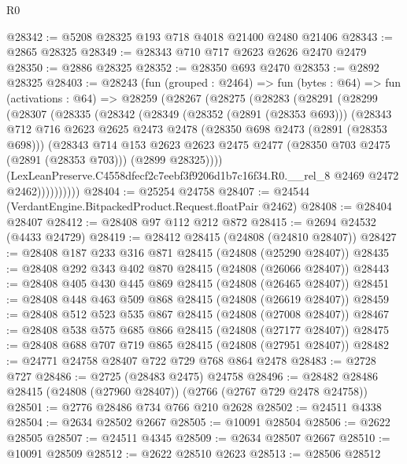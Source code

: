 \begin{lexlean}{R0}
\begin{coremodule}
@28342 := @5208 @28325 @193 @718 @4018 @21400 @2480 @21406
@28343 := @2865 @28325
@28349 := @28343 @710 @717 @2623 @2626 @2470 @2479
@28350 := @2886 @28325
@28352 := @28350 @693 @2470
@28353 := @2892 @28325
@28403 := @28243
    (fun (grouped : @2464) =>
    fun (bytes : @64) =>
    fun (activations : @64) =>
    @28259
      (@28267
        (@28275
          (@28283
            (@28291
              (@28299
                (@28307
                  (@28335
                    (@28342
                      (@28349
                        (@28352 (@2891 (@28353 @693)))
                        (@28343
                          @712
                          @716
                          @2623
                          @2625
                          @2473
                          @2478
                          (@28350 @698 @2473 (@2891 (@28353 @698)))
                          (@28343
                            @714
                            @153
                            @2623
                            @2623
                            @2475
                            @2477
                            (@28350 @703 @2475 (@2891 (@28353 @703)))
                            (@2899 @28325))))
                      (LexLeanPreserve.C4558dfecf2c7eebf3f9206d1b7c16f34.R0.__rel_8
                        @2469
                        @2472
                        @2462))))))))))
@28404 := @25254 @24758
@28407 := @24544 (VerdantEngine.BitpackedProduct.Request.floatPair @2462)
@28408 := @28404 @28407
@28412 := @28408 @97 @112 @212 @872
@28415 := @2694 @24532 (@4433 @24729)
@28419 := @28412 @28415 (@24808 (@24810 @28407))
@28427 := @28408 @187 @233 @316 @871 @28415 (@24808 (@25290 @28407))
@28435 := @28408 @292 @343 @402 @870 @28415 (@24808 (@26066 @28407))
@28443 := @28408 @405 @430 @445 @869 @28415 (@24808 (@26465 @28407))
@28451 := @28408 @448 @463 @509 @868 @28415 (@24808 (@26619 @28407))
@28459 := @28408 @512 @523 @535 @867 @28415 (@24808 (@27008 @28407))
@28467 := @28408 @538 @575 @685 @866 @28415 (@24808 (@27177 @28407))
@28475 := @28408 @688 @707 @719 @865 @28415 (@24808 (@27951 @28407))
@28482 := @24771 @24758 @28407 @722 @729 @768 @864 @2478
@28483 := @2728 @727
@28486 := @2725 (@28483 @2475) @24758
@28496 := @28482 @28486 @28415 (@24808 (@27960 @28407)) (@2766 (@2767 @729 @2478 @24758))
@28501 := @2776 @28486 @734 @766 @210 @2628
@28502 := @24511 @4338
@28504 := @2634 @28502 @2667
@28505 := @10091 @28504
@28506 := @2622 @28505
@28507 := @24511 @4345
@28509 := @2634 @28507 @2667
@28510 := @10091 @28509
@28512 := @2622 @28510 @2623
@28513 := @28506 @28512

\end{coremodule}
\end{lexlean}

